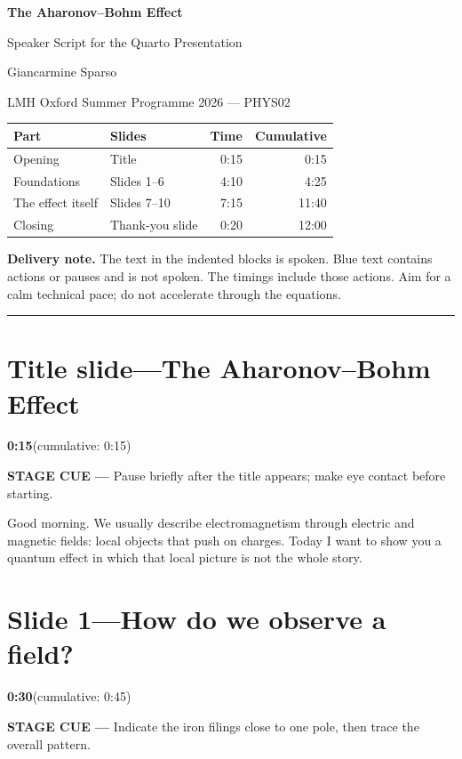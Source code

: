 \documentclass[a4paper,11pt]{article}
\newcommand{\slidetime}[2]{%
  {\small\sffamily\color{timegreen}\textbf{#1}\enspace(cumulative: #2)}%
}
\newcommand{\cue}[1]{%
  \par\smallskip
  \noindent
  {\small\sffamily\color{cueblue}\textbf{STAGE CUE ---} #1}
  \par\smallskip
}
\newenvironment{spoken}{%
  \begin{list}{}{%
    \setlength{\leftmargin}{1.1em}%
    \setlength{\rightmargin}{1.1em}%
    \setlength{\topsep}{2pt}%
    \setlength{\partopsep}{0pt}%
    \setlength{\parsep}{5pt}%
    \setlength{\itemsep}{0pt}}%
  \item\relax
}{\end{list}}
\newcommand{\slideheading}[4]{%
  \needspace{10\baselineskip}
  \section*{#1\enspace---\enspace#2}
  \vspace{-0.7em}
  \noindent\slidetime{#3}{#4}\par\smallskip
}
\begin{document}
\begin{center}
  {\LARGE\bfseries The Aharonov--Bohm Effect\par}
  \vspace{4pt}
  {\Large Speaker Script for the Quarto Presentation\par}
  \vspace{8pt}
  {\large Giancarmine Sparso\par}
  \vspace{3pt}
  {\small LMH Oxford Summer Programme 2026 --- PHYS02\par}
\end{center}

\vspace{8pt}

\begin{center}
\begin{tabularx}{0.92\textwidth}{@{}lXrr@{}}
  \toprule
  \textbf{Part} & \textbf{Slides} & \textbf{Time} & \textbf{Cumulative} \\
  \midrule
  Opening & Title & 0:15 & 0:15 \\
  Foundations & Slides 1--6 & 4:10 & 4:25 \\
  The effect itself & Slides 7--10 & 7:15 & 11:40 \\
  Closing & Thank-you slide & 0:20 & 12:00 \\
  \bottomrule
\end{tabularx}
\end{center}

\smallskip
\noindent
\textbf{Delivery note.}
The text in the indented blocks is spoken. Blue text contains actions or
pauses and is not spoken. The timings include those actions. Aim for a calm
technical pace; do not accelerate through the equations.

\medskip
\hrule

\slideheading{Title slide}{The Aharonov--Bohm Effect}{0:15}{0:15}

\cue{Pause briefly after the title appears; make eye contact before starting.}

\begin{spoken}
Good morning. We usually describe electromagnetism through electric and
magnetic fields: local objects that push on charges. Today I want to show you
a quantum effect in which that local picture is not the whole story.
\end{spoken}


\slideheading{Slide 1}{How do we observe a field?}{0:30}{0:45}

\cue{Indicate the iron filings close to one pole, then trace the overall pattern.}
\end{document}
